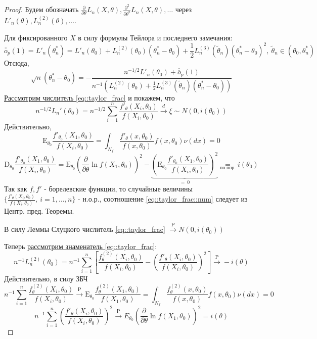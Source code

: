 \documentclass[12pt]{article}
\theoremstyle{basic_theorem}
\theoremstyle{name_theorem}
\def\E{ \mathrm{E} }
\def\D{ \mathrm{D} }
\def\P{ \mathrm{P} }
\def\littleO{ \overline{\overline{o}} }
\begin{document}
    \begin{proof}
        Будем обозначать \(\frac{\partial}{\partial\theta}L_n(X, \theta), \frac{\partial^2}{\partial\theta^2}L_n(X, \theta), \ldots\)
        через \(L'_n(\theta), L^{(2)}_n(\theta), \ldots\).

        Для фиксированного \(X\) в силу формулы Тейлора и последнего замечания:
        \[\littleO_p(1) = L'_n(\theta^*_n) = L'_n(\theta_0) + L^{(2)}_n(\theta_0)(\theta^*_n - \theta_0) +
        \frac{1}{2}L_n^{(3)}(\widetilde{\theta}_n)(\theta^*_n - \theta_0)^2,\ \widetilde{\theta}_n \in(\theta_0, \theta_n^*)\]
        Отсюда,
        \begin{equation}
            \label{eq::taylor_frac}
            \sqrt{n}(\theta^*_n - \theta_0) = -\frac{n^{-1/2} L'_n(\theta_0) + \littleO_p(1)}{n^{-1}(L^{(2)}_n(\theta_0) + \frac{1}{2}L^{(3)}_n(\widetilde{\theta}_n)(\theta^*_n - \theta_0))}
        \end{equation}
        \underline{Рассмотрим числитель \eqref{eq::taylor_frac}} и покажем, что
        \begin{equation}
            \label{eq::taylor_frac::num}
            n^{-1/2}L_n'(\theta_0) = n^{-1/2}\sum_{i=1}^n \frac{f'_\theta(X_i, \theta_0)}{f(X_i, \theta_0)} \xrightarrow{d} \xi\sim N(0, i(\theta_0))
        \end{equation}
        Действительно,
        \[\E_{\theta_0}\frac{f'_{\theta_0}(X_1, \theta_0)}{f(X_i, \theta_0)} = \int_{N_f}\frac{f'_\theta(x, \theta_0)}{f(x,\theta_0)} f(x,\theta_0) \nu(dx) = 0\]
        \[\D_{\theta_0}\frac{f'_{\theta_0}(X_1, \theta_0)}{f(X_i, \theta_0)} = \E_{\theta_0}\left(\frac{\partial}{\partial\theta}\ln f(X_1, \theta_0)\right)^2 - \underbrace{\left(\E_{\theta_0}\frac{f'_{\theta_0}(X_1, \theta_0)}{f(X_i, \theta_0)}\right)^2 }_{ =\ 0} \underset{\text{по опр.}}{=} i(\theta_0)\]
        Так как \(f, f'\) - борелевские функции, то случайные величины \(\{\frac{f'_\theta(X_i, \theta_0)}{f(X_i, \theta_0)},\ i=1,\ldots,n\}\) - н.о.р.,
        соотношение \eqref{eq::taylor_frac::num} следует из Центр. пред. Теоремы.

        В силу Леммы Слуцкого числитель \eqref{eq::taylor_frac} \(\xrightarrow{\P} N(0, i(\theta_0))\)

        Теперь \underline{рассмотрим знаменатель \eqref{eq::taylor_frac}}:
        \begin{equation}
            \label{eq::taylor_frac::den}
            n^{-1}L_n^{(2)}(\theta_0) = n^{-1}\sum^n_{i=1}\left[ \frac{f^{(2)}_\theta(X_i, \theta_0)}{f(X_i, \theta_0)} - \left(\frac{f'_\theta(X_i, \theta_0)}{f(X_i, \theta_0)}\right)^2\right] \xrightarrow{\P} -i(\theta)
        \end{equation}
        Действительно, в силу ЗБЧ
        \[n^{-1}\sum^n_{i=1} \frac{f^{(2)}_\theta(X_i, \theta_0)}{f(X_i, \theta_0)} \xrightarrow{\P} \E_{\theta_0}\frac{f^{(2)}_\theta(X_1, \theta_0)}{f(X_1, \theta_0)} = \int_{N_f} \frac{f^{(2)}_\theta(x, \theta_0)}{f(x, \theta_0)} f(x, \theta_0) \nu(dx) = 0\]
        \[n^{-1}\sum^n_{i=1} \left(\frac{f'_\theta(X_i, \theta_0)}{f(X_i, \theta_0)}\right)^2 \xrightarrow{\P} E_{\theta_0} \left(\frac{\partial}{\partial\theta} \ln f(X_1, \theta_0)\right)^2 = i(\theta)\]


\end{proof}
\end{document}
